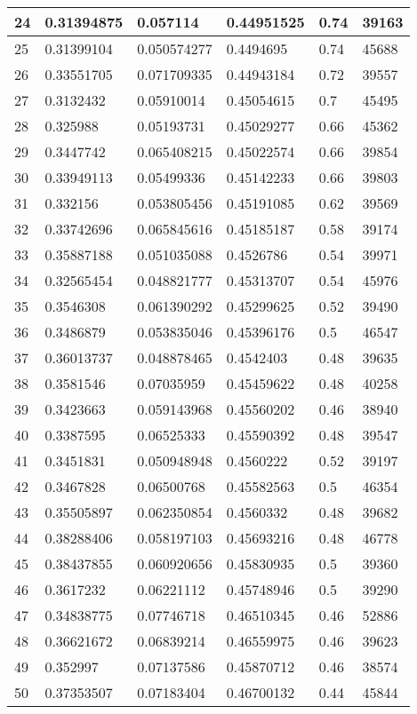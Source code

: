 \begin{longtable}{|l|l|l|l|l|l|}
24 & 0.31394875 & 0.057114 & 0.44951525 & 0.74 & 39163 \\ \hline 
25 & 0.31399104 & 0.050574277 & 0.4494695 & 0.74 & 45688 \\ \hline 
26 & 0.33551705 & 0.071709335 & 0.44943184 & 0.72 & 39557 \\ \hline 
27 & 0.3132432 & 0.05910014 & 0.45054615 & 0.7 & 45495 \\ \hline 
28 & 0.325988 & 0.05193731 & 0.45029277 & 0.66 & 45362 \\ \hline 
29 & 0.3447742 & 0.065408215 & 0.45022574 & 0.66 & 39854 \\ \hline 
30 & 0.33949113 & 0.05499336 & 0.45142233 & 0.66 & 39803 \\ \hline 
31 & 0.332156 & 0.053805456 & 0.45191085 & 0.62 & 39569 \\ \hline 
32 & 0.33742696 & 0.065845616 & 0.45185187 & 0.58 & 39174 \\ \hline 
33 & 0.35887188 & 0.051035088 & 0.4526786 & 0.54 & 39971 \\ \hline 
34 & 0.32565454 & 0.048821777 & 0.45313707 & 0.54 & 45976 \\ \hline 
35 & 0.3546308 & 0.061390292 & 0.45299625 & 0.52 & 39490 \\ \hline 
36 & 0.3486879 & 0.053835046 & 0.45396176 & 0.5 & 46547 \\ \hline 
37 & 0.36013737 & 0.048878465 & 0.4542403 & 0.48 & 39635 \\ \hline 
38 & 0.3581546 & 0.07035959 & 0.45459622 & 0.48 & 40258 \\ \hline 
39 & 0.3423663 & 0.059143968 & 0.45560202 & 0.46 & 38940 \\ \hline 
40 & 0.3387595 & 0.06525333 & 0.45590392 & 0.48 & 39547 \\ \hline 
41 & 0.3451831 & 0.050948948 & 0.4560222 & 0.52 & 39197 \\ \hline 
42 & 0.3467828 & 0.06500768 & 0.45582563 & 0.5 & 46354 \\ \hline 
43 & 0.35505897 & 0.062350854 & 0.4560332 & 0.48 & 39682 \\ \hline 
44 & 0.38288406 & 0.058197103 & 0.45693216 & 0.48 & 46778 \\ \hline 
45 & 0.38437855 & 0.060920656 & 0.45830935 & 0.5 & 39360 \\ \hline 
46 & 0.3617232 & 0.06221112 & 0.45748946 & 0.5 & 39290 \\ \hline 
47 & 0.34838775 & 0.07746718 & 0.46510345 & 0.46 & 52886 \\ \hline 
48 & 0.36621672 & 0.06839214 & 0.46559975 & 0.46 & 39623 \\ \hline 
49 & 0.352997 & 0.07137586 & 0.45870712 & 0.46 & 38574 \\ \hline 
50 & 0.37353507 & 0.07183404 & 0.46700132 & 0.44 & 45844 \\ \hline 
\end{longtable}